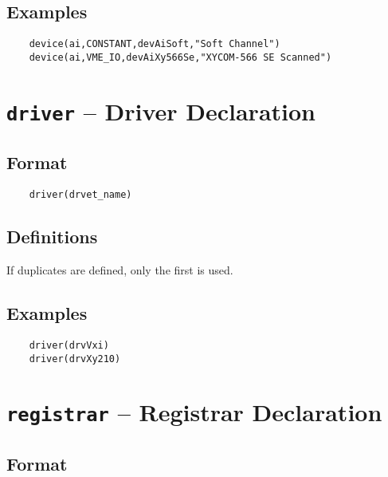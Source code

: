\subsection{Examples}

\begin{verbatim}
    device(ai,CONSTANT,devAiSoft,"Soft Channel")
    device(ai,VME_IO,devAiXy566Se,"XYCOM-566 SE Scanned")
\end{verbatim}

\section{\texttt{driver} -- Driver Declaration}

\subsection{Format}

\begin{verbatim}
    driver(drvet_name)
\end{verbatim}

\subsection{Definitions}

\begin{description}
\item [drvet\_name] If duplicates are defined, only the first is used.

\end{description}

\subsection{Examples}

\begin{verbatim}
    driver(drvVxi)
    driver(drvXy210)
\end{verbatim}

\section{\texttt{registrar} -- Registrar Declaration}

\subsection{Format}

